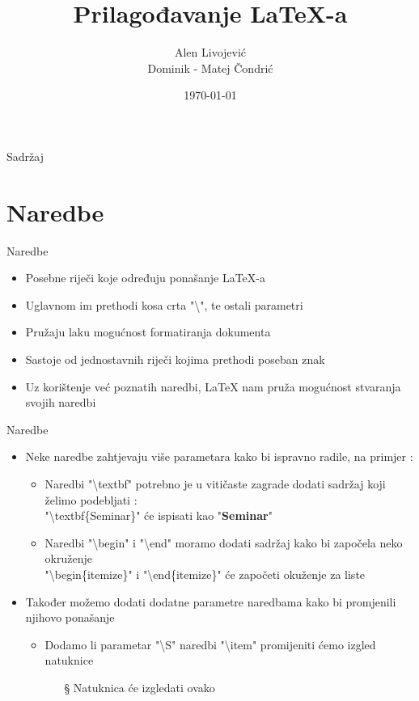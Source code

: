\documentclass{beamer}
\title{Prilagođavanje LaTeX-a}
\author{Alen Livojević \\ Dominik - Matej Čondrić}
\institute{Tehnički fakultet Rijeka}
\date{\today}
\begin{document}
\begin{frame}
\titlepage
\end{frame}

\begin{frame}[t]{Sadržaj}
\tableofcontents
\end{frame}

\section{Naredbe}

\begin{frame}[t]{Naredbe}
\begin{itemize}
\item Posebne riječi koje određuju ponašanje LaTeX-a
\item Uglavnom im prethodi kosa crta "\textbackslash", te ostali parametri
\item Pružaju laku mogućnost formatiranja dokumenta 
\item Sastoje od jednostavnih riječi kojima prethodi poseban znak 
\item Uz korištenje već poznatih naredbi, LaTeX nam pruža mogućnost stvaranja svojih naredbi 
\end{itemize}
\end{frame}

\begin{frame}[t]{Naredbe}
\begin{itemize}
	\item Neke naredbe zahtjevaju više parametara kako bi ispravno radile, na primjer :
		\begin{itemize}
			\item Naredbi "\textbackslash textbf" potrebno je u vitičaste zagrade dodati sadržaj koji želimo podebljati :
			\\
			"\textbackslash textbf\{Seminar\}" će ispisati kao "\textbf{Seminar}" \\
			\item Naredbi "\textbackslash begin" i "\textbackslash end" moramo dodati sadržaj kako bi započela neko okruženje
			\\
			"\textbackslash begin\{itemize\}" i "\textbackslash end\{itemize\}" će započeti okuženje za liste 
		\end{itemize}
	\item Također možemo dodati dodatne parametre naredbama kako bi promjenili njihovo ponašanje
		\begin{itemize}
			\item Dodamo li parametar "\textbackslash S" naredbi "\textbackslash item" promijeniti ćemo izgled natuknice
			\begin{itemize}
				\item[\S] Natuknica će izgledati ovako 
			\end{itemize}	
		\end{itemize}		
\end{itemize}	
\end{frame}
\end{document}
